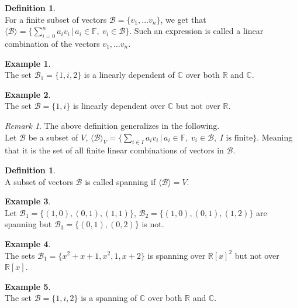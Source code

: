 \documentclass[12pt]{article}
\newcommand{\double}{\hspace{2pt}}
\theoremstyle{definition}
\newtheorem{definition}[theorem]{Definition}
\newtheorem*{example}{Example}
\theoremstyle{remark}
\newtheorem*{remark}{Remark}
\theoremstyle{plain}
\begin{document}
\begin{definition}\leavevmode \\
     For a finite subset of vectors $\mathcal{B}=\{ v_1,\ldots v_n \}$, we get that $\langle \mathcal{B}\rangle=\{ \sum\limits_{i=0}^na_iv_i \double | \double a_i\in\mathbb{F}, \hspace{3pt} v_i\in \mathcal{B}\}$. Such an expression is called a linear combination of the vectors $v_1, \ldots v_n$.
\end{definition}
\begin{example}\leavevmode \\
    The set $\mathcal{B}_1=\{ 1,i,2\}$ is a linearly dependent of $\mathbb{C}$ over both $\mathbb{R}$ and $\mathbb{C}$.
\end{example}
\begin{example}\leavevmode \\
    The set $\mathcal{B}=\{ 1,i\}$ is linearly dependent over $\mathbb{C}$ but not over $\mathbb{R}$.
\end{example}
\begin{remark}
    The above definition generalizes in the following.\\
     Let $\mathcal{B}$ be a subset of $V$, $\langle \mathcal{B}\rangle_V=\{ \sum_{i\in I} a_iv_i \double | \double a_i\in \mathbb{F},  \hspace{3pt} v_i\in \mathcal{B},\hspace{3pt}I \text{ is finite}\}$. Meaning that it is the set of all finite linear combinations of vectors in $\mathcal{B}$.
\end{remark}
\begin{definition}\leavevmode \\
     A subset of vectors $\mathcal{B}$ is called spanning if $\langle \mathcal{B}\rangle=V$.
\end{definition}
\begin{example}\leavevmode \\
     Let $\mathcal{B}_1=\{ (1,0), (0,1),(1,1)\}$, $\mathcal{B}_2=\{ (1,0), (0,1),(1,2)\}$ are spanning but $\mathcal{B}_3=\{ (0,1),(0,2)\}$ is not.
\end{example}
\begin{example}\leavevmode \\
    The sets $\mathcal{B}_1=\{ x^2+x+1, x^2,1,x+2\}$ is spanning over $\mathbb{R}[x]^2$ but not over $\mathbb{R}[x]$.
\end{example}
\begin{example}\leavevmode \\
    The set $\mathcal{B}=\{ 1,i,2\}$ is a spanning of $\mathbb{C}$ over both $\mathbb{R}$ and $\mathbb{C}$.
\end{example}
\end{document}
